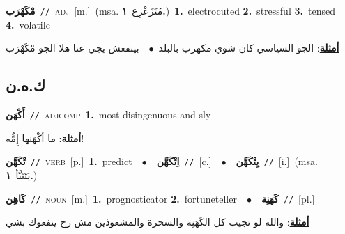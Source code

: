 \documentclass[10pt,a4paper,twoside]{article} %
\begin{document}
\begin{multicols}{2}
{\setlength\topsep{0pt}\textbf{\foreignlanguage{arabic}{مْكَهْرَب}}\ {\color{gray}\texttt{//}\color{black}}\ \textsc{adj}\ [m.]\ \color{gray}(msa. \foreignlanguage{arabic}{مُتَزَعْزِع}~\foreignlanguage{arabic}{\textbf{١.}})\color{black}\ \textbf{1.}~electrocuted  \textbf{2.}~stressful  \textbf{3.}~tensed  \textbf{4.}~volatile\  \begin{flushright}\color{gray}\foreignlanguage{arabic}{\textbf{\underline{\foreignlanguage{arabic}{أمثلة}}}: الجو السياسي كان شوي مكهرب بالبلد\ $\bullet$\ \  بينفعش يجي عنا هلا الجو مْكَهْرَب}\end{flushright}\color{black}} \vspace{2mm}

\vspace{-3mm}
\subsection*{\color{blue}\foreignlanguage{arabic}{ك.ه.ن}\color{blue}{}} 

{\setlength\topsep{0pt}\textbf{\foreignlanguage{arabic}{أَكْهَن}}\ {\color{gray}\texttt{//}\color{black}}\ \textsc{adj\textunderscore comp}\ \textbf{1.}~most disingenuous and sly\  \begin{flushright}\color{gray}\foreignlanguage{arabic}{\textbf{\underline{\foreignlanguage{arabic}{أمثلة}}}: ما أكْهَنها إِمُّه!}\end{flushright}\color{black}} \vspace{2mm}

{\setlength\topsep{0pt}\textbf{\foreignlanguage{arabic}{تْكَهَّن}}\ {\color{gray}\texttt{//}\color{black}}\ \textsc{verb}\ [p.]\ \textbf{1.}~predict\ \ $\bullet$\ \ \setlength\topsep{0pt}\textbf{\foreignlanguage{arabic}{اِتْكَهَّن}}\ {\color{gray}\texttt{//}\color{black}}\ [c.]\ \ $\bullet$\ \ \setlength\topsep{0pt}\textbf{\foreignlanguage{arabic}{يِتْكَهَّن}}\ {\color{gray}\texttt{//}\color{black}}\ [i.]\ \color{gray}(msa. \foreignlanguage{arabic}{يَتَنَبَّأ}~\foreignlanguage{arabic}{\textbf{١.}})\color{black}\ } \vspace{2mm}

{\setlength\topsep{0pt}\textbf{\foreignlanguage{arabic}{كَاهِن}}\ {\color{gray}\texttt{//}\color{black}}\ \textsc{noun}\ [m.]\ \textbf{1.}~prognosticator  \textbf{2.}~fortuneteller\ \ $\bullet$\ \ \setlength\topsep{0pt}\textbf{\foreignlanguage{arabic}{كَهَنِة}}\ {\color{gray}\texttt{//}\color{black}}\ [pl.]\  \begin{flushright}\color{gray}\foreignlanguage{arabic}{\textbf{\underline{\foreignlanguage{arabic}{أمثلة}}}: والله لو تجيب كل الكَهَنِة والسحرة والمشعوذين مش رح ينفعوك بشي}\end{flushright}\color{black}} \vspace{2mm}


\end{multicols}
\end{document}
